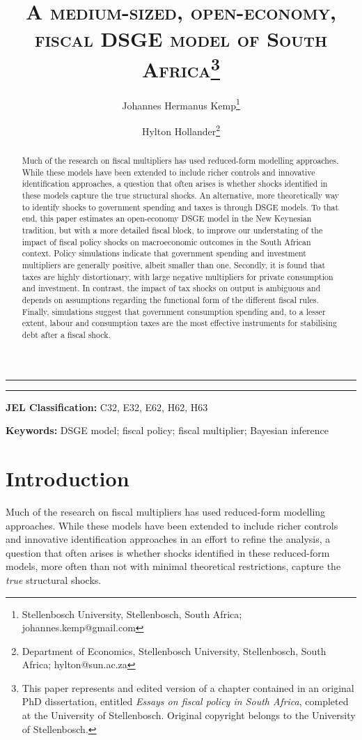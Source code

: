 \documentclass[a4paper,11pt]{article}
\title{\textsc{A medium-sized, open-economy, fiscal DSGE model of South Africa}\footnote{This paper represents and edited version of a chapter contained in an original PhD dissertation, entitled \textit{Essays on fiscal policy in South Africa}, completed at the University of Stellenbosch. Original copyright belongs to the University of Stellenbosch.}}
\author{

Johannes Hermanus Kemp\footnote{Stellenbosch University, Stellenbosch, South Africa; johannes.kemp@gmail.com}

\and

Hylton Hollander\footnote{Department of Economics, Stellenbosch University, Stellenbosch, South Africa; hylton@sun.ac.za} 

}
\numberwithin{equation}{section}
\begin{document}
	

\maketitle
	\thispagestyle{empty}
	\noindent\rule{16.5cm}{0.4pt}
	
	\begin{abstract}
		  \noindent Much of the research on fiscal multipliers has used reduced-form modelling approaches. While these models have been extended to include richer controls and innovative identification approaches, a question that often arises is whether shocks identified in these models capture the true structural shocks. An alternative, more theoretically way to identify shocks to government spending and taxes is through DSGE models. To that end, this paper estimates an open-economy DSGE model in the New Keynesian tradition, but with a more detailed fiscal block, to improve our understating of the impact of fiscal policy shocks on macroeconomic outcomes in the South African context. Policy simulations indicate that government spending and investment multipliers are generally positive, albeit smaller than one. Secondly, it is found that taxes are highly distortionary, with large negative multipliers for private consumption and investment. In contrast, the impact of tax shocks on output is ambiguous and depends on assumptions regarding the functional form of the different fiscal rules. Finally, simulations suggest that government consumption spending and, to a lesser extent, labour and consumption taxes are the most effective instruments for stabilising debt after a fiscal shock. 
	\end{abstract}
	
	\noindent\rule{16.5cm}{0.4pt}
	
	

\textbf{JEL Classification:} C32, E32, E62, H62, H63
	
\textbf{Keywords:} DSGE model; fiscal policy; fiscal multiplier; Bayesian inference 
	
\newpage
{}


\section{Introduction}
	
	Much of the research on fiscal multipliers has used reduced-form modelling approaches. While these models have been extended to include richer controls and innovative identification approaches in an effort to refine the analysis, a question that often arises is whether shocks identified in these reduced-form models, more often than not with minimal theoretical restrictions, capture the \textit{true} structural shocks. 
	
\end{document}
